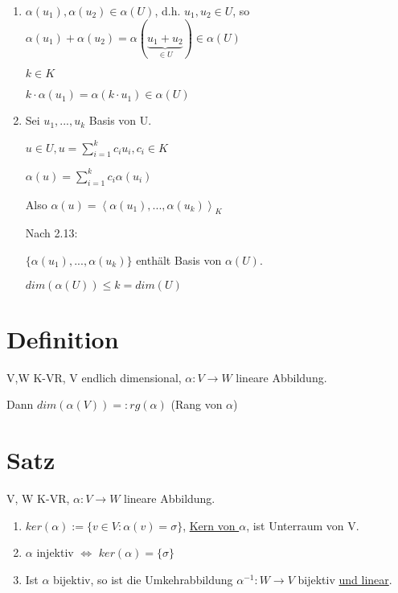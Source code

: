 \documentclass[a4paper, openany]{book}
\begin{document}
      \begin{enumerate}[label=(\alph*)]
        \item $\alpha(u_1), \alpha(u_2) \in \alpha(U)$, d.h. $u_1, u_2 \in U$, so $\alpha(u_1) + \alpha(u_2) = \alpha(\underbrace{u_1+u_2}_{\in U}) \in \alpha(U)$

        $k \in K$

        $k \cdot \alpha(u_1) = \alpha(k \cdot u_1) \in \alpha(U)$

        \item Sei $u_1, ..., u_k$ Basis von U.

        $u \in U, u = \sum_{i=1}^{k} c_i u_i, c_i \in K$

        $\alpha(u) = \sum_{i=1}^{k} c_i \alpha(u_i)$

        Also $\alpha(u) = \left \langle \alpha(u_1), ..., \alpha(u_k) \right \rangle_K$

        Nach 2.13: 

        $\{\alpha(u_1), ..., \alpha(u_k)\}$ enthält Basis von $\alpha(U)$.

        $dim(\alpha(U)) \le k = dim(U)$
      \end{enumerate}

      \section{Definition}

      V,W K-VR, V endlich dimensional, $\alpha : V \rightarrow W$ lineare Abbildung. 

      \par \medskip

      Dann $dim(\alpha(V)) =: rg(\alpha)$ (Rang von $\alpha$)

      \section{Satz}

      V, W K-VR, $\alpha: V \rightarrow W$ lineare Abbildung.

      \begin{enumerate}[label=(\alph*)]
        \item $ker(\alpha) := \{v \in V : \alpha(v) = \sigma\}$, \underline{Kern von $\alpha$}, ist Unterraum von V.

        \item $\alpha$ injektiv $\Leftrightarrow$ $ker(\alpha) = \{\sigma\}$

        \item Ist $\alpha$ bijektiv, so ist die Umkehrabbildung $\alpha^{-1} : W \rightarrow V$ bijektiv \underline{und linear}.
      \end{enumerate}
\end{document}
